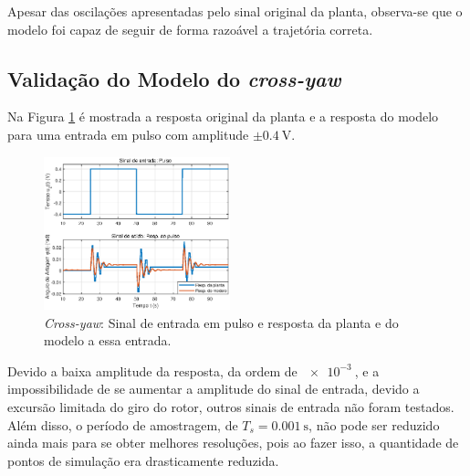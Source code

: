 Apesar das oscilações apresentadas pelo sinal original da planta, observa-se que o modelo foi capaz de seguir de forma razoável a trajetória correta.

\subsection{\textbf{Validação do Modelo do \textit{cross-yaw}}}

Na Figura \ref{fig:ValidaCrossYawPulso} é mostrada a resposta original da planta e a resposta do modelo para uma entrada em pulso com amplitude $\pm \SI{0.4}{\volt}$.

\begin{figure}[H]
    \centering
    \includegraphics[width=0.48\textwidth]{figures/Validacao/ValidaCrossYawPulso.eps}
    \caption{\textit{Cross-yaw}: Sinal de entrada em pulso e resposta da planta e do modelo a essa entrada.}
    \label{fig:ValidaCrossYawPulso}
\end{figure}

Devido a baixa amplitude da resposta, da ordem de $\SI{e-3}{}$, e a impossibilidade de se aumentar a amplitude do sinal de entrada, devido a excursão limitada do giro do rotor, outros sinais de entrada não foram testados. Além disso, o período de amostragem, de $T_{s} = \SI{0.001}{\s}$, não pode ser reduzido ainda mais para se obter melhores resoluções, pois ao fazer isso, a quantidade de pontos de simulação era drasticamente reduzida.